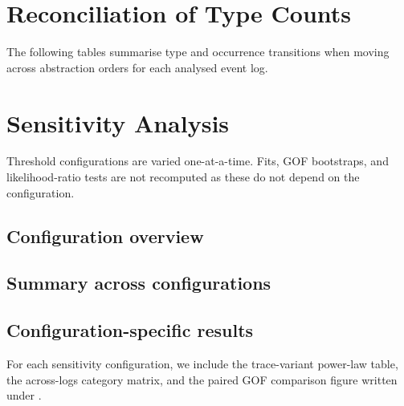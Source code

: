 \documentclass[11pt,a4paper]{article}
\begin{document}
\noindent


\section{Reconciliation of Type Counts}
\label{sec:transitions}

The following tables summarise type and occurrence transitions when moving
across abstraction orders for each analysed event log.



\section{Sensitivity Analysis}
\label{sec:sensitivity}

Threshold configurations are varied one-at-a-time. Fits, GOF bootstraps, and likelihood-ratio tests are not recomputed as these do not depend on the configuration.

\subsection{Configuration overview}
\label{sec:sensitivity-config}

\begin{table}[H]
\centering
\caption{One-at-a-time sensitivity configurations used in the appendix.}
\label{tab:sensitivity-configurations}
\AppendixSensitivityConfigurationsInput
\end{table}

\subsection{Summary across configurations}
\label{sec:sensitivity-summary}

\begin{table}[htbp]
\centering
\caption{Summary of trace-variant outcomes and paired GOF diagnostics across
sensitivity configurations.}
\label{tab:sensitivity-summary}
\begingroup
\setlength{\tabcolsep}{2.5pt}%
\scriptsize
\AppendixSensitivitySummaryInput
\endgroup
\end{table}

\subsection{Configuration-specific results}
\label{sec:sensitivity-detail}

For each sensitivity configuration, we include the trace-variant power-law
table, the across-logs category matrix, and the paired GOF comparison figure
written under
\AppendixClausetConfigDirPath{}.
\end{document}
